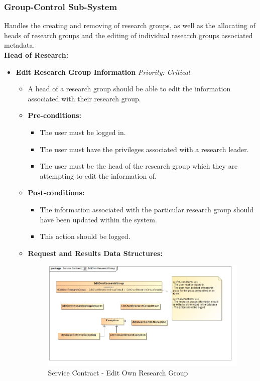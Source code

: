 \documentclass{article}
\begin{document}
			\subsubsection{Group-Control Sub-System}\label{subsubsec:group}
				Handles the creating and removing of research groups, as well as the allocating of heads of research groups and the editing of individual research groups associated metadata.\\
				[3mm]
				\textbf{Head of Research:}
				\begin{itemize}
					\item \textbf{Edit Research Group Information} \hfill \textit{Priority: Critical}
					\begin{itemize}
						\item A head of a research group should be able to edit the information associated with their research group.
						\item \textbf{Pre-conditions:}
						\begin{itemize}
							\item The user must be logged in.
							\item The user must have the privileges associated with a research leader.
							\item The user must be the head of the research group which they are attempting to edit the information of.
						\end{itemize}
						\item \textbf{Post-conditions:}
						\begin{itemize}
							\item The information associated with the particular research group should have been updated within the system.
							\item This action should be logged.
						\end{itemize}
						\item \textbf{Request and Results Data Structures:}
						\begin{figure}[H]
							\includegraphics[width=\linewidth]{../Diagrams/ServiceContracts/Group control subsystem/EditOwnResearchGroup.jpg}
							\caption{Service Contract - Edit Own Research Group}
						\end{figure}
					\end{itemize}
				\end{itemize}
				
\end{document}
